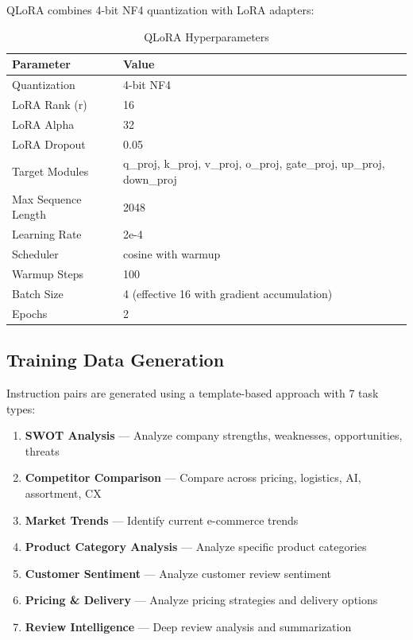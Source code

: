\documentclass[12pt,a4paper]{article}
\begin{document}
QLoRA combines 4-bit NF4 quantization with LoRA adapters:

\begin{table}[h!]
\centering
\caption{QLoRA Hyperparameters}
\begin{tabular}{ll}
\toprule
Parameter & Value \\
\midrule
Quantization & 4-bit NF4 \\
LoRA Rank (r) & 16 \\
LoRA Alpha & 32 \\
LoRA Dropout & 0.05 \\
Target Modules & q_proj, k\_proj, v\_proj, o\_proj, gate\_proj, up\_proj, down\_proj \\
Max Sequence Length & 2048 \\
Learning Rate & 2e-4 \\
Scheduler & cosine with warmup \\
Warmup Steps & 100 \\
Batch Size & 4 (effective 16 with gradient accumulation) \\
Epochs & 2 \\
\bottomrule
\end{tabular}
\end{table}

\subsection{Training Data Generation}

Instruction pairs are generated using a template-based approach with 7 task types:

\begin{enumerate}
    \item \textbf{SWOT Analysis} — Analyze company strengths, weaknesses, opportunities, threats
    \item \textbf{Competitor Comparison} — Compare across pricing, logistics, AI, assortment, CX
    \item \textbf{Market Trends} — Identify current e-commerce trends
    \item \textbf{Product Category Analysis} — Analyze specific product categories
    \item \textbf{Customer Sentiment} — Analyze customer review sentiment
    \item \textbf{Pricing \& Delivery} — Analyze pricing strategies and delivery options
    \item \textbf{Review Intelligence} — Deep review analysis and summarization
\end{enumerate}
\end{document}
